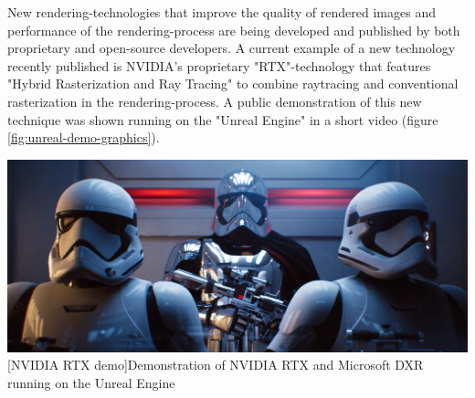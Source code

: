 New rendering-technologies that improve the quality of rendered images and performance of the rendering-process are being developed and published by both proprietary and open-source developers. A current example of a new technology recently published is NVIDIA's proprietary "RTX"-technology \cite{NVIDIARTX} that features "Hybrid Rasterization and Ray Tracing" \cite{NVIDIARayTracing} to combine raytracing and conventional rasterization in the rendering-process. A public demonstration of this new technique was shown running on the "Unreal Engine" in a short video (figure \ref{fig:unreal-demo-graphics})\cite{UnrealDemoReflections}.
\begin{center}
\noindent\includegraphics[width=14cm]{tex/img/ch05/UnrealGraphicsDemo.png}
[NVIDIA RTX demo]{Demonstration of NVIDIA RTX and Microsoft DXR running on the Unreal Engine \cite{UnrealDemoReflections}}
\label{fig:unreal-demo-graphics}
\end{center}

